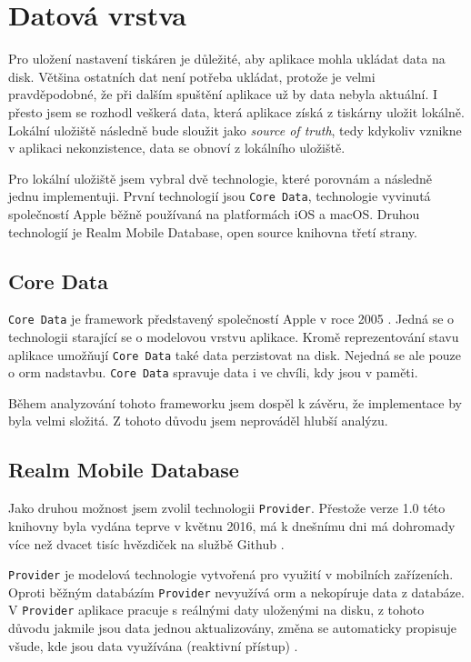 \section{Datová vrstva}\label{analyza-datova-vrstva}

Pro uložení nastavení tiskáren je důležité, aby aplikace mohla ukládat data na disk.
Většina ostatních dat není potřeba ukládat, protože je velmi pravděpodobné, že při dalším spuštění aplikace už by data nebyla aktuální.
I přesto jsem se rozhodl veškerá data, která aplikace získá z tiskárny uložit lokálně.
Lokální uložiště následně bude sloužit jako \textit{source of truth}, tedy kdykoliv vznikne v aplikaci nekonzistence, data se obnoví z lokálního uložiště.

Pro lokální uložiště jsem vybral dvě technologie, které porovnám a následně jednu implementuji.
První technologií jsou \texttt{Core Data}, technologie vyvinutá společností Apple běžně používaná na platformách iOS a macOS.
Druhou technologií je Realm Mobile Database, open source knihovna třetí strany.

\subsection{Core Data}

\texttt{Core Data} je framework představený společností Apple v roce 2005 \cite{objcio-core-data}.
Jedná se o technologii starající se o modelovou vrstvu aplikace.
Kromě reprezentování stavu aplikace umožňují \texttt{Core Data} také data perzistovat na disk.
Nejedná se ale pouze o \acrfull{orm} nadstavbu.
\texttt{Core Data} spravuje data i ve chvíli, kdy jsou v paměti.

Během analyzování tohoto frameworku jsem dospěl k závěru, že implementace by byla velmi složitá.
Z tohoto důvodu jsem neprováděl hlubší analýzu.

\subsection{Realm Mobile Database}\label{datova-vrstva-realm}

Jako druhou možnost jsem zvolil technologii \texttt{Provider}.
Přestože verze 1.0 této knihovny byla vydána teprve v květnu 2016, má k dnešnímu dni má dohromady více než dvacet tisíc hvězdiček na službě Github \cite{github-realm-repos}.

\texttt{Provider} je modelová technologie vytvořená pro využití v mobilních zařízeních.
Oproti běžným databázím \texttt{Provider} nevyužívá \acrshort{orm} a nekopíruje data z databáze.
V \texttt{Provider} aplikace pracuje s reálnými daty uloženými na disku, z tohoto důvodu jakmile jsou data jednou aktualizovány, změna se automaticky propisuje všude, kde jsou data využívána (reaktivní přístup) \cite{realm-overview}.


